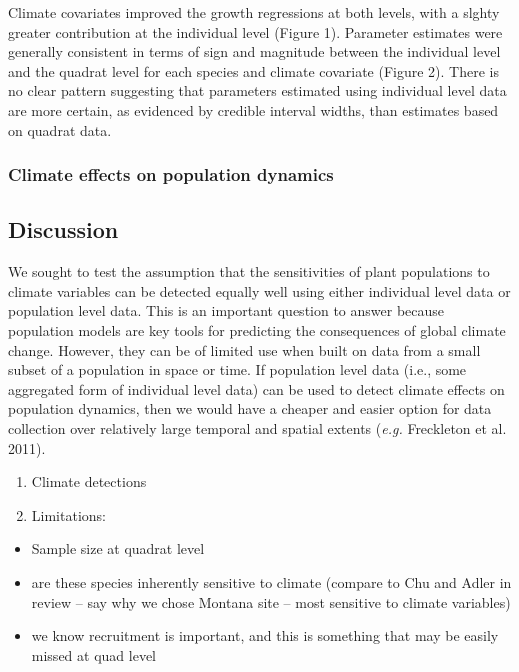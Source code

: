 \documentclass[12pt,]{article}
\begin{document}
Climate covariates improved the growth regressions at both levels, with
a slghty greater contribution at the individual level (Figure 1).
Parameter estimates were generally consistent in terms of sign and
magnitude between the individual level and the quadrat level for each
species and climate covariate (Figure 2). There is no clear pattern
suggesting that parameters estimated using individual level data are
more certain, as evidenced by credible interval widths, than estimates
based on quadrat data.

\subsubsection{Climate effects on population
dynamics}\label{climate-effects-on-population-dynamics}

\subsection{Discussion}\label{discussion}

We sought to test the assumption that the sensitivities of plant
populations to climate variables can be detected equally well using
either individual level data or population level data. This is an
important question to answer because population models are key tools for
predicting the consequences of global climate change. However, they can
be of limited use when built on data from a small subset of a population
in space or time. If population level data (i.e., some aggregated form
of individual level data) can be used to detect climate effects on
population dynamics, then we would have a cheaper and easier option for
data collection over relatively large temporal and spatial extents
(\emph{e.g.} Freckleton et al. 2011).

\begin{enumerate}
\def\labelenumi{\arabic{enumi}.}
\itemsep1pt\parskip0pt
\item
  Climate detections
\item
  Limitations:
\end{enumerate}

\begin{itemize}
\itemsep1pt\parskip0pt
\item
  Sample size at quadrat level
\item
  are these species inherently sensitive to climate (compare to Chu and
  Adler in review -- say why we chose Montana site -- most sensitive to
  climate variables)
\item
  we know recruitment is important, and this is something that may be
  easily missed at quad level
\end{itemize}
\end{document}
